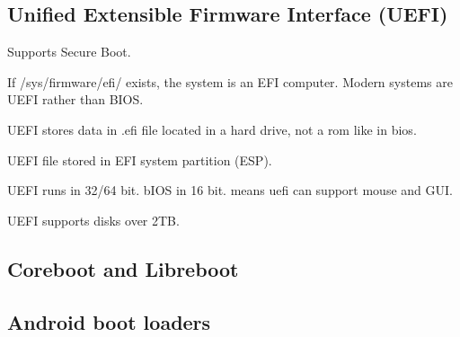 
\subsection{Unified Extensible Firmware Interface (UEFI)}

Supports Secure Boot.

If /sys/firmware/efi/ exists, the system is an EFI computer. Modern systems are UEFI rather than BIOS.


UEFI stores data in .efi file located in a hard drive, not a rom like in bios.

UEFI file stored in EFI system partition (ESP).

UEFI  runs in 32/64 bit. bIOS in 16 bit. means uefi can support mouse and GUI.

UEFI  supports disks over 2TB.

\subsection{Coreboot and Libreboot}


\subsection{Android boot loaders}

